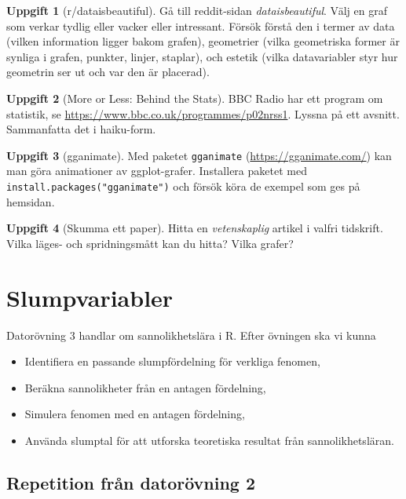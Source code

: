 \documentclass[
]{book}
\theoremstyle{definition}
\theoremstyle{definition}
\theoremstyle{definition}
\newtheorem{exercise}{Uppgift}[chapter]
\theoremstyle{definition}
\theoremstyle{remark}
\begin{document}
\begin{exercise}[r/dataisbeautiful]
Gå till reddit-sidan \emph{dataisbeautiful}. Välj en graf som verkar tydlig eller vacker eller intressant. Försök förstå den i termer av data (vilken information ligger bakom grafen), geometrier (vilka geometriska former är synliga i grafen, punkter, linjer, staplar), och estetik (vilka datavariabler styr hur geometrin ser ut och var den är placerad).
\end{exercise}

\begin{exercise}[More or Less: Behind the Stats]
BBC Radio har ett program om statistik, se \url{https://www.bbc.co.uk/programmes/p02nrss1}. Lyssna på ett avsnitt. Sammanfatta det i haiku-form.
\end{exercise}

\begin{exercise}[gganimate]
Med paketet \texttt{gganimate} (\url{https://gganimate.com/}) kan man göra animationer av ggplot-grafer. Installera paketet med \texttt{install.packages("gganimate")} och försök köra de exempel som ges på hemsidan.
\end{exercise}

\begin{exercise}[Skumma ett paper]
Hitta en \emph{vetenskaplig} artikel i valfri tidskrift. Vilka läges- och spridningsmått kan du hitta? Vilka grafer?
\end{exercise}

\hypertarget{slumpvariabler}{%
\chapter{Slumpvariabler}\label{slumpvariabler}}

Datorövning 3 handlar om sannolikhetslära i R. Efter övningen ska vi kunna

\begin{itemize}
\item
  Identifiera en passande slumpfördelning för verkliga fenomen,
\item
  Beräkna sannolikheter från en antagen fördelning,
\item
  Simulera fenomen med en antagen fördelning,
\item
  Använda slumptal för att utforska teoretiska resultat från sannolikhetsläran.
\end{itemize}

\hypertarget{repetition-fruxe5n-datoruxf6vning-2}{%
\section{Repetition från datorövning 2}\label{repetition-fruxe5n-datoruxf6vning-2}}
\end{document}
